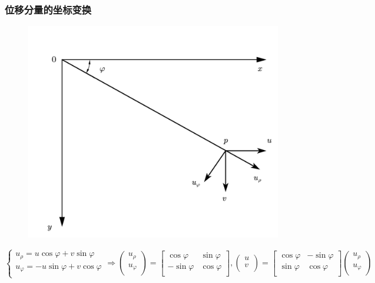 \subsubsection{位移分量的坐标变换}
\begin{figure}[!h]
\centering
\includegraphics[scale=0.5]{figure/4-2.png}
\caption{}
\end{figure}
\begin{equation}
\begin{cases}
u_{\rho}=u\cos \varphi +v\sin \varphi\\
u_{\varphi}=-u\sin \varphi +v\cos \varphi\\
\end{cases}\Longrightarrow \left( \begin{array}{c}
u_{\rho}\\
u_{\varphi}\\
\end{array} \right) =\left[ \begin{matrix}
\cos \varphi&		\sin \varphi\\
-\sin \varphi&		\cos \varphi\\
\end{matrix} \right] 
,
	\left( \begin{array}{c}
u\\
v\\
\end{array} \right) =\left[ \begin{matrix}
\cos \varphi&		-\sin \varphi\\
\sin \varphi&		\cos \varphi\\
\end{matrix} \right] \left( \begin{array}{c}
u_{\rho}\\
u_{\varphi}\\
\end{array} \right) 
\end{equation}
